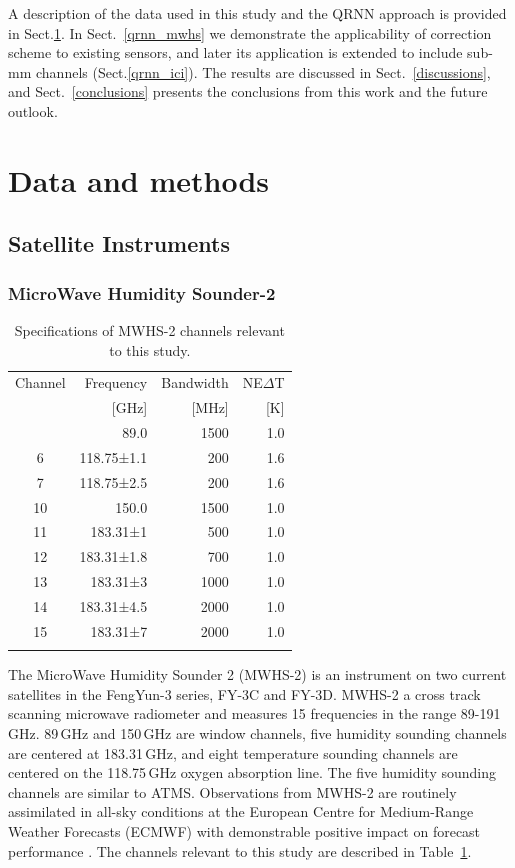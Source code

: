 \documentclass[amt, manuscript]{copernicus}
\begin{document}
A description of the data used in this study and the QRNN approach is provided
in Sect.\ref{data_methods}. In Sect.~\ref{qrnn_mwhs} we demonstrate the
applicability of correction scheme to existing sensors, and later its
application is extended to include sub-mm channels (Sect.\ref{qrnn_ici}). The
results are discussed in Sect.~\ref{discussions}, and Sect.~\ref{conclusions}
presents the conclusions from this work and the future outlook.


\section{Data and methods}
\label{data_methods}
%
\subsection{Satellite Instruments}
%
\subsubsection{ MicroWave Humidity Sounder-2}
%
\begin{table}[t]
	\caption{Specifications of MWHS-2 channels relevant to this study.}
	\label{tab:specifications_MWHS2}	
	\begin{tabular}{crrr}
		\tophline
		Channel & Frequency 	& Bandwidth & NE$\Delta$T \\
		& [GHz]			& [MHz]		& [K]		\\
		\middlehline
		1	&	89.0   		  & 1500			&	1.0	\\
		6	&	118.75±1.1    & \phantom{0}200 	&	1.6\\
		7	&	118.75±2.5    & \phantom{0}200 	&	1.6\\
		10	&	150.0         & 1500 			&	1.0 \\
		11	&	183.31±1      & \phantom{0}500  &	1.0 \\
		12  & 	183.31±1.8    & \phantom{0}700 	&   1.0\\
		13  & 	183.31±3      & 1000    		&	1.0	\\
		14  & 	183.31±4.5    & 2000    		&	1.0\\
		15  & 	183.31±7      & 2000  			&	1.0  \\
		\bottomhline
	\end{tabular}
	\belowtable{} %
\end{table}
The MicroWave Humidity Sounder 2 (MWHS-2) is an instrument on two current satellites in the FengYun-3 series, FY-3C and FY-3D. MWHS-2 a cross track scanning microwave radiometer and measures 15 frequencies in the range 89-191\,GHz. 89\,GHz and 150\,GHz are window channels, five humidity sounding channels are centered at 183.31\,GHz, and eight temperature sounding channels are centered on the 118.75\,GHz oxygen absorption line. The five humidity sounding channels are similar to ATMS. Observations from MWHS-2 are routinely assimilated in all-sky conditions at the European Centre for Medium-Range Weather Forecasts (ECMWF) with demonstrable positive impact on forecast performance \citep{duncan2020MWHS}. The channels relevant to this study are described in Table~\ref{tab:specifications_MWHS2}. 
\end{document}
